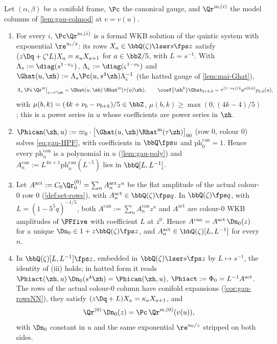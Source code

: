 
\begin{thm}
\label{thm:gau-R0}
Let $(\alpha,\beta)$ be a conifold frame, $\Pc$ the canonical gauge, and $\Qr^{\mathrm m,(i)}$ the model columns of \cref{lem:gau-colmod} at $v=v(u)$.
\begin{enumerate}
\item For every $i$, $\Pc\Qr^{\mathrm m,(i)}$ is a formal WKB solution of the quintic system with exponential $\re^{u_i/z}$: its rows $X_a\in\bbQ(\zeta)\lser s\fps z$ satisfy $(z\Dq+\zeta^iL)X_a=\kappa_aX_{a+1}$ for $a\in\bbZ/5$, with $L=s^{-1}$. With $\Lambda_s:=\diag(s^{1-\nu_a})$, $\Lambda_\varsigma:=\diag(\varsigma^{1-\nu_b})$ and $\Ghat(u,\zh):=\Lambda_s\Pc(u,s^4\zh)\Lambda_\varsigma^{-1}$ (the hatted gauge of \cref{lem:mai-Ghat}),
\[
\Lambda_s\,\Pc\,\Qr^{\mathrm m}\big|_{z=s^4\zh}=\Ghat(u,\zh)\,\Rhat^{\mathrm m}(\tau(u)\zh),\qquad \coef{\zh^k}\Ghat_{b+k,b}=\tau^{(1-\nu_b)/4}u^{\mu(b,k)}p_{k,b}(u),
\]
with $\mu(b,k)=(4k+\nu_b-\nu_{b+k})/5\in\bbZ$, $\mu(b,k)\geq\max(0,(4k-4)/5)$; this is a power series in $u$ whose coefficients are power series in $\zh$.
\item $\Phican(\zh,u):=\varpi_0\cdot\bigl[\Ghat(u,\zh)\Rhat^{\mathrm m}(\tau\zh)\bigr]_{00}$ (row $0$, colour $0$) solves \eqref{eq:gau-HPF}, with coefficients in $\bbQ\fps u$ and $\mathrm{ph}^{\mathrm{can}}_0=1$. Hence every $\mathrm{ph}^{\mathrm{can}}_n$ is a polynomial in $u$ (\cref{lem:gau-poly}) and $A^{\mathrm{can}}_n:=L^{4n+1}\mathrm{ph}^{\mathrm{can}}_n(L^{-5})$ lies in $\bbQ[L,L^{-1}]$.
\item Let $A^{\mathrm{act}}:=C_0\Qr^{(0)}_0=\sum_nA^{\mathrm{act}}_nz^n$ be the flat amplitude of the actual colour-$0$ row $0$ (\cref{def:set-rows}), with $A^{\mathrm{act}}_n\in\bbQ(\zeta)\fps q$. In $\bbQ(\zeta)\fps q$, with $L=(1-5^5q)^{-1/5}$, both $A^{\mathrm{can}}:=\sum_nA^{\mathrm{can}}_nz^n$ and $A^{\mathrm{act}}$ are colour-$0$ WKB amplitudes of $\PFfive$ with coefficient $L$ at $z^0$. Hence $A^{\mathrm{can}}=A^{\mathrm{act}}\,\Dn_0(z)$ for a unique $\Dn_0\in1+z\bbQ(\zeta)\fps z$, and $A^{\mathrm{act}}_n\in\bbQ(\zeta)[L,L^{-1}]$ for every $n$.
\item In $\bbQ(\zeta)[L,L^{-1}]\fps z$, embedded in $\bbQ(\zeta)\lser s\fps z$ by $L\mapsto s^{-1}$, the identity of (iii) holds; in hatted form it reads $\Phiact(\zh,u)\,\Dn_0(s^4\zh)=\Phican(\zh,u)$, $\Phiact:=\Phi_0=L^{-1}A^{\mathrm{act}}$. The rows of the actual colour-$0$ column have conifold expansions (\cref{cor:gau-rowsNN}), they satisfy $(z\Dq+L)X_a=\kappa_aX_{a+1}$, and
\begin{equation}
\label{eq:gau-R0zero}
\Qr^{(0)}\,\Dn_0(z)=\Pc\,\Qr^{\mathrm m,(0)}(v(u)),
\end{equation}
with $\Dn_0$ constant in $u$ and the same exponential $\re^{u_0/z}$ stripped on both sides.
\end{enumerate}
\end{thm}

